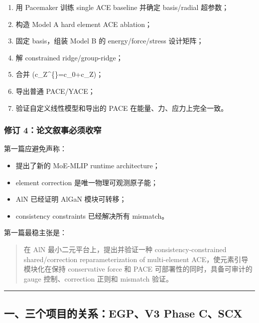 \documentclass[
  12pt,
]{ctexart}
\providecommand{\tightlist}{%
  \setlength{\itemsep}{0pt}\setlength{\parskip}{0pt}}
\begin{document}
\begin{enumerate}
\def\labelenumi{\arabic{enumi}.}
\tightlist
\item
  用 Pacemaker 训练 single ACE baseline 并确定 basis/radial 超参数；
\item
  构造 Model A hard element ACE ablation；
\item
  固定 basis，组装 Model B 的 energy/force/stress 设计矩阵；
\item
  解 constrained ridge/group-ridge；
\item
  合并 (\mathbf c\_Z\^{}\{\}=\mathbf c\_0+\mathbf c\_Z)；
\item
  导出普通 PACE/YACE；
\item
  验证自定义线性模型和导出的 PACE 在能量、力、应力上完全一致。
\end{enumerate}

\subsubsection{修订
4：论文叙事必须收窄}\label{ux4feeux8ba2-4ux8bbaux6587ux53d9ux4e8bux5fc5ux987bux6536ux7a84}

第一篇应避免声称：

\begin{itemize}
\tightlist
\item
  提出了新的 MoE-MLIP runtime architecture；
\item
  element correction 是唯一物理可观测原子能；
\item
  AlN 已经证明 AlGaN 模块可转移；
\item
  consistency constraints 已经解决所有 mismatch。
\end{itemize}

第一篇最稳主张是：

\begin{quote}
在 AlN 最小二元平台上，提出并验证一种 consistency-constrained
shared/correction reparameterization of multi-element
ACE，使元素引导模块化在保持 conservative force 和 PACE
可部署性的同时，具备可审计的 gauge 控制、correction 正则和 mismatch
验证。
\end{quote}

\begin{center}\rule{0.5\linewidth}{0.5pt}\end{center}

\subsection{一、三个项目的关系：EGP、V3 Phase
C、SCX}\label{ux4e00ux4e09ux4e2aux9879ux76eeux7684ux5173ux7cfbegpv3-phase-cscx}
\end{document}
